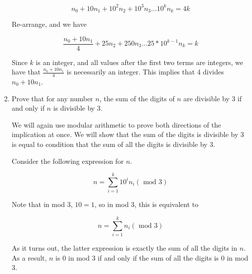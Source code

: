 \begin{enumerate}
\begin{solution}
$$n_0 + 10 n_1 + 10^2 n_2 + 10^3 n_3 \dots 10^k n_k = 4k$$

Re-arrange, and we have

$$\frac{n_0 + 10 n_1}{4} + 25 n_2 + 250 n_3 \dots 25 * 10^{k-1} n_k = k$$

Since $k$ is an integer, and all values after the first two terms are integers,
we have that $\frac{n_0 + 10 n_1}{4}$ is necessarily an integer. This
implies that 4 divides $n_0 + 10 n_1$.
\end{solution}
\item Prove that for any number $n$, the sum of the digits of $n$ are divisible by 3 if and only if $n$ is divisible by 3.

\begin{solution}
We will again use modular arithmetic to prove both directions of the
implication at once. We will show that the sum of the digits is divisible by 3
is equal to condition that the sum of all the digits is divisible by 3.

Consider the following expression for $n$.

$$n = \sum_{i=1}^k 10^i n_i (\text{ mod } 3)$$

Note that in mod 3, $10 = 1$, so in mod 3, this is equivalent to

$$n = \sum_{i=1}^k n_i (\text{ mod } 3)$$

As it turns out, the latter expression is exactly the sum of all the digits
in $n$. As a result, $n$ is 0 in mod 3 if and only if the sum of all the
digits is 0 in mod 3.

\end{solution}
\end{enumerate}
